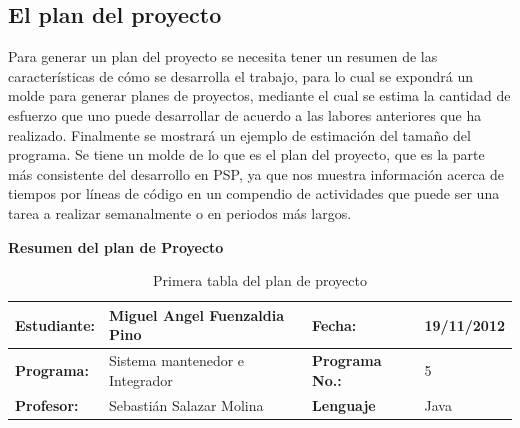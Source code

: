 \documentclass[a4paper,12pt,openany,oneside]{book}
\begin{document}
\subsection{El plan del proyecto}
Para generar un plan del proyecto se necesita tener un resumen de las características de cómo se desarrolla el trabajo, para lo cual se expondrá un molde para generar planes de proyectos, mediante el cual se estima la cantidad de esfuerzo que uno puede desarrollar de acuerdo a las labores anteriores que ha realizado. Finalmente se mostrará un ejemplo de estimación del tamaño del programa. Se tiene un molde de lo que es el plan del proyecto, que es la parte más consistente del desarrollo en PSP, ya que nos muestra información acerca de tiempos por líneas de código en un compendio de actividades que puede ser una tarea a realizar semanalmente o en periodos más largos.
\begin{table}[!ht]
\textbf{Resumen del plan de Proyecto}\\
\begin{tabular}{| l | l | l | l |}
\hline
\textbf{Estudiante:} & Miguel Angel Fuenzaldia Pino & \textbf{Fecha:} & 19/11/2012\\
\hline
\textbf{Programa:} & Sistema mantenedor e Integrador & \textbf{Programa No.:} & 5\\
\hline
\textbf{Profesor:} & Sebastián Salazar Molina & \textbf{Lenguaje} & Java  \\
\hline
\end{tabular}
\caption{Primera tabla del plan de proyecto}
\end{table}
\end{document}
